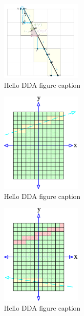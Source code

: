 	\begin{figure}
	  \centering
	  \includegraphics[width=4cm]{DDA.png}
	  \caption{Hello DDA figure caption}\label{fig:DDA-figsA}
	\end{figure}
	\begin{figure}
	  \centering
	  \includegraphics[width=4cm]{Space_Carving_1.png}
	  \caption{Hello DDA figure caption }\label{fig:SC-one-figsA}
	\end{figure}
	\begin{figure}
	  \centering
	  \includegraphics[width=4cm]{Space_Carving_2.png}
	  \caption{Hello DDA figure caption }\label{fig:SC-two-figsA}
	\end{figure}
